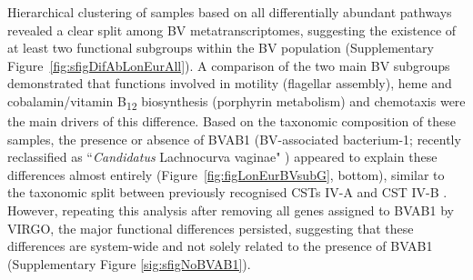 \documentclass[sn-mathphys,Numbered]{sn-jnl}%
\begin{document}
Hierarchical clustering of samples based on all differentially abundant pathways revealed a clear split among BV metatranscriptomes, suggesting the existence of at least two functional subgroups within the BV population (Supplementary Figure~\ref{fig:sfigDifAbLonEurAll}). A comparison of the two main BV subgroups demonstrated that functions involved in motility (flagellar assembly), heme and cobalamin/vitamin B\textsubscript{12} biosynthesis (porphyrin metabolism) and chemotaxis were the main drivers of this difference. Based on the taxonomic composition of these samples, the presence or absence of BVAB1 (BV-associated bacterium-1; recently reclassified as ``\textit{Candidatus} Lachnocurva vaginae" \citep{holm_comparative_2020}) appeared to explain these differences almost entirely (Figure~\ref{fig:figLonEurBVsubG}, bottom), similar to the taxonomic split between previously recognised CSTs IV-A and CST IV-B \citep{france_valencia_2020}. However, repeating this analysis after removing all genes assigned to BVAB1 by VIRGO, the major functional differences persisted, suggesting that these differences are system-wide and not solely related to the presence of BVAB1 (Supplementary Figure \ref{sig:sfigNoBVAB1}).
\end{document}
